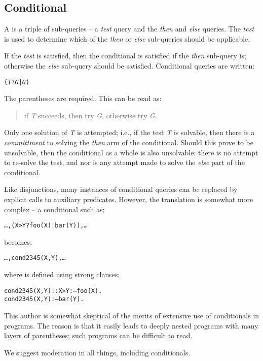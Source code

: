 \subsection{Conditional}
\label{goal:conditional}

A   is a triple of sub-queries -- a \emph{test} query and the \emph{then} and \emph{else} queries. The \emph{test} is used to determine which of the \emph{then} or \emph{else} sub-queries should be applicable.

If the \emph{test} is satisfied, then the conditional is satisfied if the \emph{then} sub-query is; otherwise the \emph{else} sub-query should be satisfied.  Conditional queries are written: 
\begin{alltt}
(\emph{T}?\emph{G}|\emph{G})
\end{alltt}
The parentheses are required. This can be read as:
\begin{quote}
if \emph{T} succeeds, then try \emph{G}, otherwise try \emph{G}.
\end{quote}
Only one solution of \emph{T} is attempted; i.e., if the test \emph{T} is solvable, then there is a \emph{committment} to solving the \emph{then} arm of the conditional. Should this prove to be unsolvable, then the conditional as a whole is also unsolvable: there is no attempt to re-solve the test, and nor is any attempt made to solve the \emph{else} part of the conditional.

Like disjunctions, many instances of conditional queries can be replaced by explicit calls to auxiliary predicates. However, the translation is somewhat more complex -- a conditional such as:
\begin{alltt}
\ldots,(X>Y?foo(X)|bar(Y)),\ldots
\end{alltt}
becomes:
\begin{alltt}
\ldots,cond2345(X,Y),\ldots
\end{alltt}
where  is defined using strong clauses:
\begin{alltt}
cond2345(X,Y)::X>Y :-- foo(X).
cond2345(X,Y) :-- bar(Y).
\end{alltt}
\begin{aside}
This author is somewhat skeptical of the merits of extensive use of conditionals in programs. The reason is that it easily leads to deeply nested programs with many layers of parentheses; such programs can be difficult to read.

We suggest moderation in all things, including conditionals.
\end{aside}


